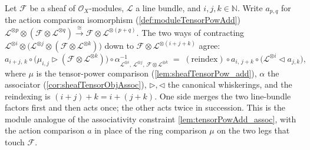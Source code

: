\begin{lemma}
  \label{lem:moduleTensorPowAdd_assoc}
  Let \(\mathcal{F}\) be a sheaf of \(\mathcal{O}_X\)-modules, \(\mathcal{L}\) a line
  bundle, and \(i, j, k \in \mathbb{N}\). Write \(a_{p,q}\) for the action comparison
  isomorphism (\cref{def:moduleTensorPowAdd})
  \(\mathcal{L}^{\otimes p}\otimes(\mathcal{F}\otimes\mathcal{L}^{\otimes q})
  \xrightarrow{\cong}\mathcal{F}\otimes\mathcal{L}^{\otimes(p+q)}\). The two ways of
  contracting
  \(\mathcal{L}^{\otimes i}\otimes\bigl(\mathcal{L}^{\otimes j}\otimes
  (\mathcal{F}\otimes\mathcal{L}^{\otimes k})\bigr)\) down to
  \(\mathcal{F}\otimes\mathcal{L}^{\otimes(i+j+k)}\) agree:
  \[
    a_{i+j,\,k}\circ\bigl(\mu_{i,j}\rhd(\mathcal{F}\otimes\mathcal{L}^{\otimes k})\bigr)
      \circ \alpha^{-1}_{\mathcal{L}^{\otimes i},\,\mathcal{L}^{\otimes j},\,
        \mathcal{F}\otimes\mathcal{L}^{\otimes k}}
    \;=\;
    \mathrm{(reindex)}\circ a_{i,\,j+k}\circ
      \bigl(\mathcal{L}^{\otimes i}\lhd a_{j,k}\bigr),
  \]
  where \(\mu\) is the tensor-power comparison (\cref{lem:sheafTensorPow_add}),
  \(\alpha\) the associator (\cref{cor:sheafTensorObjAssoc}), \(\rhd, \lhd\) the
  canonical whiskerings, and the reindexing is \((i+j)+k = i+(j+k)\). One side merges
  the two line-bundle factors first and then acts once; the other acts twice in
  succession. This is the module analogue of the associativity constraint
  \cref{lem:tensorPowAdd_assoc}, with the action comparison \(a\) in place of the
  ring comparison \(\mu\) on the two legs that touch \(\mathcal{F}\).
\end{lemma}

